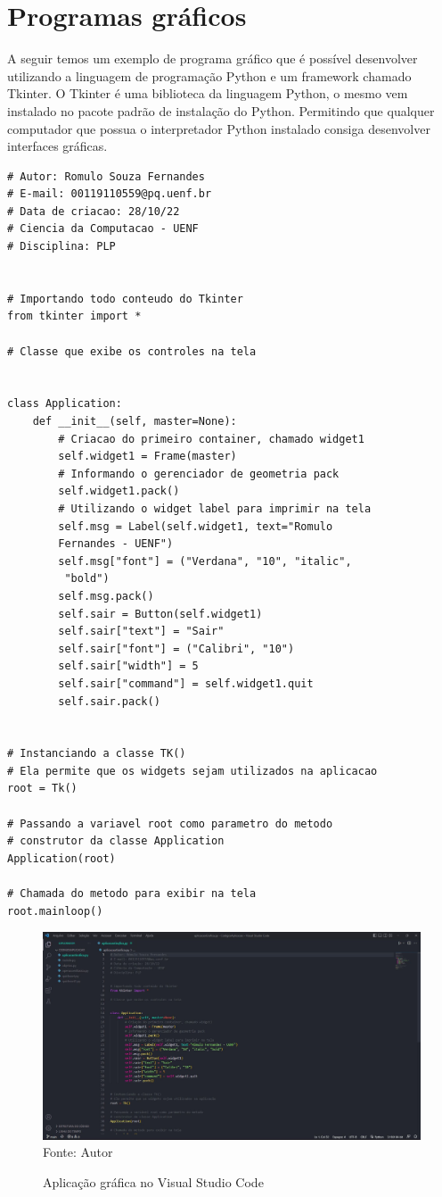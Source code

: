 	
    \section{Programas gráficos}
     A seguir temos um exemplo de programa gráfico que é possível desenvolver utilizando a linguagem de programação Python e um framework chamado Tkinter. O Tkinter é uma biblioteca da linguagem Python, o mesmo vem instalado no pacote padrão de instalação do Python. Permitindo que qualquer computador que possua o interpretador Python instalado consiga desenvolver interfaces gráficas.
	\begin{lstlisting}
# Autor: Romulo Souza Fernandes
# E-mail: 00119110559@pq.uenf.br
# Data de criacao: 28/10/22
# Ciencia da Computacao - UENF
# Disciplina: PLP


# Importando todo conteudo do Tkinter
from tkinter import *

# Classe que exibe os controles na tela


class Application:
	def __init__(self, master=None):
		# Criacao do primeiro container, chamado widget1
		self.widget1 = Frame(master)
		# Informando o gerenciador de geometria pack
		self.widget1.pack()
		# Utilizando o widget label para imprimir na tela
		self.msg = Label(self.widget1, text="Romulo 
		Fernandes - UENF")
		self.msg["font"] = ("Verdana", "10", "italic",
		 "bold")
		self.msg.pack()
		self.sair = Button(self.widget1)
		self.sair["text"] = "Sair"
		self.sair["font"] = ("Calibri", "10")
		self.sair["width"] = 5
		self.sair["command"] = self.widget1.quit
		self.sair.pack()


# Instanciando a classe TK()
# Ela permite que os widgets sejam utilizados na aplicacao
root = Tk()

# Passando a variavel root como parametro do metodo
# construtor da classe Application
Application(root)

# Chamada do metodo para exibir na tela
root.mainloop()
	\end{lstlisting}

	\begin{figure}[H]
		\begin{center}
			\caption{Aplicação gráfica no Visual Studio Code} \label{ling1}
			\includegraphics[width=15cm]{graficocode.JPG} \\
			{\tiny \sf Fonte:{ Autor}}
		\end{center}
	\end{figure}
	

